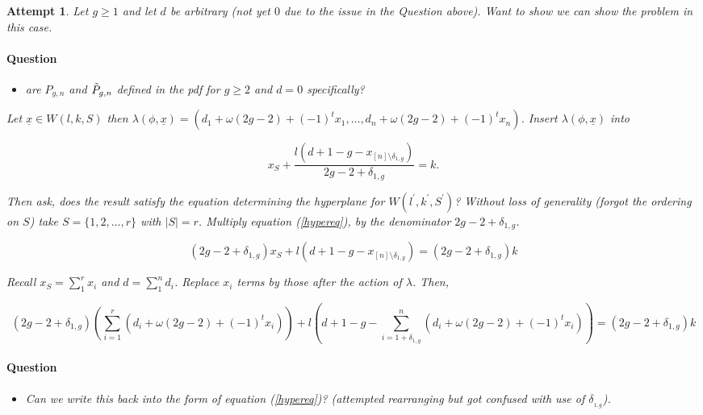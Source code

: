 \documentclass[a4paper,12pt]{article}
\newtheorem{attempt}{Attempt}
\theoremstyle{definition}
\theoremstyle{indented}
\newenvironment{titlemize}[1]{%
  \paragraph{#1}
  \begin{itemize}}
  {\end{itemize}}
\begin{document}
\begin{attempt}

Let $g \ge 1$ and let $d$ be arbitrary (not yet $0$ due to the issue in the Question above). Want to show we can show the problem in this case.

\begin{titlemize}{Question}
  \item are $P_{g,n}$ and $\Tilde{P}_{g,n}$ defined in the pdf for $g \ge 2$ and $d=0$ specifically? 
\end{titlemize} 


Let $\underline{x} \in W(l,k,S)$ then $\lambda(\phi, \underline{x}) = (d_1 +\omega(2g-2) + (-1)^{t} x_1, \dots ,d_n +\omega(2g-2) + (-1)^{t} x_n )$. Insert $\lambda(\phi, \underline{x})$ into 

\begin{equation} \label{hypereq}
    x_S + \frac{ l(d+1-g - x_{[n]\setminus{\delta_{1,g}} } ) } {2g-2+\delta_{1,g}} = k.
\end{equation}


Then ask, does the result satisfy the equation determining the hyperplane for $W(l^{'} ,k^{'},S^{'})$? Without loss of generality (forgot the ordering on $S$) take $S=\{1,2,\dots,r\}$ with $|S|=r$. Multiply equation (\ref{hypereq}), by the denominator $2g-2+ \delta_{1,g}$. 


$$ (2g-2+\delta_{1,g})x_S +  l(d+1-g - x_{[n]\setminus{\delta_{1,g}} } ) = (2g-2+\delta_{1,g}) k$$

Recall $x_S= \sum_1^r x_i $ and $d=\sum^{n}_1 d_i$. Replace $x_i$ terms by those after the action of $\lambda$. Then,


$$ (2g-2+\delta_{1,g})(\sum_{i=1}^{r} (d_i+\omega(2g-2)+(-1)^{t} x_i)) +  l(d+1-g - \sum_{i={1+\delta_{1,g}}} ^{n} (d_i+\omega(2g-2)+(-1)^{t} x_i  ) ) = (2g-2+\delta_{1,g}) k$$
 
 \begin{titlemize}{Question}
 \item  Can we write this back into the form of equation (\ref{hypereq})? (attempted rearranging but got confused with use of $\delta__{1,g}$).
 \end{titlemize}

 


\end{attempt}
\end{document}
